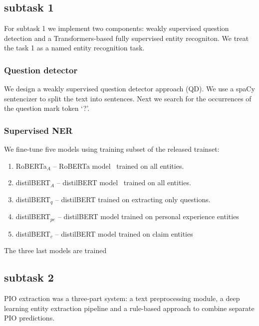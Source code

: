 \documentclass[11pt]{article}
\begin{document}
\subsection{subtask 1} \label{sec:system1}
\label{subsec:syst_task1}
%
For subtask 1 we implement two components: weakly supervised question detection and a Transformers-based fully supervised entity recogniton.
We treat the task 1 as a named entity recognition task.

\subsubsection*{Question detector}


We design a weakly supervised question detector approach (QD).
We use a spaCy sentencizer to split the text into sentences.
Next we search for the occurrences of the question mark token `?'. 



\subsubsection*{Supervised NER}


We fine-tune five models using training subset of the released trainset:

\begin{enumerate}
\item RoBERTa$_A$ -- RoBERTa model~\cite{Liu2019RoBERTaAR} trained on all entities. %
\item distilBERT$_A$ -- distilBERT model~\cite{Sanh2019DistilBERTAD} trained on all entities.  %
\item  distilBERT$_q$ --  distilBERT trained on extracting only questions. %
\item distilBERT$_{pe}$ -- distilBERT model trained on personal experience entities %
\item distilBERT$_c$ -- distilBERT model trained on claim entities %
\end{enumerate}

The three last models are trained 



%
%
%
\subsection{subtask 2}
\label{system:task2}
%
PIO extraction was a three-part system: a text preprocessing module, a deep learning entity extraction pipeline and a rule-based approach to combine separate PIO predictions.
%
%
%
\end{document}
